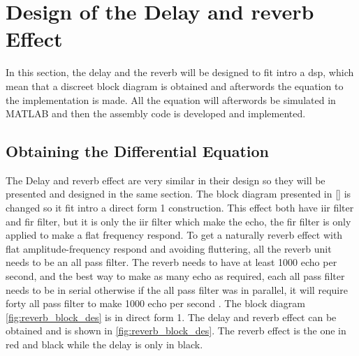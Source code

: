 \section{Design of the Delay and \gls{reverb} Effect}
In this section, the delay and the \gls{reverb} will be designed to fit intro a \gls{dsp}, which mean that a discreet block diagram is obtained and afterwords the equation to the implementation is made. All the equation will afterwords be simulated in MATLAB and then the assembly code is developed and implemented. 


\subsection{Obtaining the Differential Equation}
The Delay and \gls{reverb} effect are very similar in their design so they will be presented and designed in the same section. The block diagram presented in \autoref{} is changed so it fit intro a direct form 1 construction. This effect both have \gls{iir} filter and \gls{fir} filter, but it is only the \gls{iir} filter which make the echo, the \gls{fir} filter is only applied to make a flat frequency respond. To get a naturally \gls{reverb} effect with flat amplitude-frequency respond and avoiding fluttering, all the \gls{reverb} unit needs to be an all pass filter. The \gls{reverb} needs to have at least 1000 echo per second, and the best way to make as many echo as required, each all pass filter needs to be in serial otherwise if the all pass filter was in parallel, it will require forty all pass filter to make 1000 echo per second \citep{natural_sounding_revorb}. The block diagram \autoref{fig:reverb_block_des} is in direct form 1. The delay and \gls{reverb} effect can be obtained and is shown in \autoref{fig:reverb_block_des}. The \gls{reverb} effect is the one in red and black while the delay is only in black. 

\newpage

